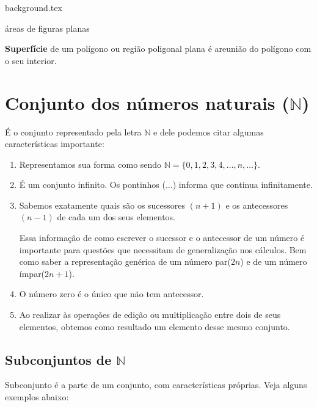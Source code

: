 \documentclass[10pt]{article}
\begin{document}
    {background.tex} %
        \begin{center}
            {\LARGE {\sc áreas de figuras planas}}
        \end{center}

\begin{definicao}
\textbf{Superfície} de um polígono ou região poligonal plana é areunião do polígono com o seu interior.
\end{definicao}

\section*{Conjunto dos números naturais (\( \mathbb{N} \))}
É o conjunto representado pela letra \( \mathbb{N}\) e dele podemos citar algumas características importante:

    \begin{enumerate}[label=\textbf{(\Roman*)}]
        \item Representamos sua forma como sendo \( \mathbb{N} = \{0, 1, 2, 3, 4, \ldots, n, \ldots\}\).
        \item É um conjunto infinito. Os pontinhos (\(\ldots\)) informa que continua infinitamente.
        \item Sabemos exatamente quais são os sucessores \((n+1)\) e os antecessores \((n-1)\) de cada um dos seus elementos.
        
        \begin{obs}
        Essa informação de como escrever o sucessor e o antecessor de um número é importante para questões que necessitam de generalização nos cálculos. Bem como saber a representação genérica de um número par(\(2n\)) e de um número ímpar(\(2n+1\)).
        \end{obs}
        \item O número zero é o único que não tem antecessor.
        \item Ao realizar às operações de edição ou multiplicação entre dois de seus elementos, obtemos como resultado um elemento desse mesmo conjunto.
    \end{enumerate}
\subsection*{Subconjuntos de \( \mathbb{N} \)}
Subconjunto é a parte de um conjunto, com características próprias. Veja alguns exemplos abaixo:
\end{document}
